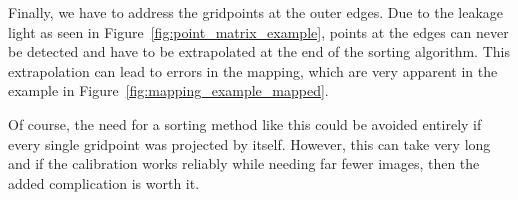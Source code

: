 Finally, we have to address the gridpoints at the outer edges. Due to the leakage light as seen in Figure~\ref{fig:point_matrix_example}, points at the edges can never be detected and have to be extrapolated at the end of the sorting algorithm. This extrapolation can lead to errors in the mapping, which are very apparent in the example in Figure~\ref{fig:mapping_example_mapped}.



Of course, the need for a sorting method like this could be avoided entirely if every single gridpoint was projected by itself. However, this can take very long and if the calibration works reliably while needing far fewer images, then the added complication is worth it.

